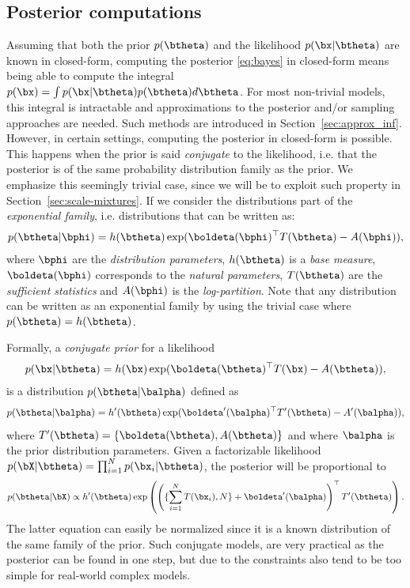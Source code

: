 \subsection{Posterior computations}
\label{sec:posterior}
Assuming that both the prior $p(\btheta)$ and the likelihood $p(\bx|\btheta)$ are known in closed-form, computing the posterior \eqref{eq:bayes} in closed-form means being able to compute the integral $p(\bx)=\int p(\bx|\btheta)p(\btheta)d\btheta$.
For most non-trivial models, this integral is intractable and approximations to the posterior and/or sampling approaches are needed.
Such methods are introduced in Section~\ref{sec:approx_inf}.
However, in certain settings, computing the posterior in closed-form is possible.
This happens when the prior is said \textit{conjugate} to the likelihood, i.e. that the posterior is of the same probability distribution family as the prior.
We emphasize this seemingly trivial case, since we will be to exploit such property in Section~\ref{sec:scale-mixtures}.
If we consider the distributions part of the \textit{exponential family}, i.e. distributions that can be written as:
\begin{align}
    p(\btheta|\bphi) = h(\btheta)\exp(\boldeta(\bphi)^\top T(\btheta) - A(\bphi)),
    \label{eq:expfamily}
\end{align}
where $\bphi$ are the \textit{distribution parameters}, $h(\btheta)$ is a \textit{base measure}, $\boldeta(\bphi)$ corresponds to the \textit{natural parameters}, $T(\btheta)$ are the \textit{sufficient statistics} and $A(\bphi)$ is the \textit{log-partition}.
Note that any distribution can be written as an exponential family by using the trivial case where $p(\btheta)=h(\btheta)$.

Formally, a \textit{conjugate prior} for a likelihood
\begin{align}
    p(\bx|\btheta) = h(\bx)\exp(\boldeta(\btheta)^\top T(\bx) - A(\btheta)),
    \label{eq:explikelihood}
\end{align}
is a distribution $p(\btheta|\balpha)$ defined as
\begin{align}
    p(\btheta|\balpha) = h'(\btheta)\exp(\boldeta'(\balpha)^\top T'(\btheta) - A'(\balpha)),
    \label{eq:expprior}
\end{align}
where $T'(\btheta) = \left\{\boldeta(\btheta), A(\btheta)\right\}$ and where $\balpha$ is the prior distribution parameters.
Given a factorizable likelihood $p(\bX|\btheta) = \prod_{i=1}^N p(\bx_i|\btheta)$, the posterior will be proportional to
\begin{align*}
    p(\btheta|\bX) \propto h'(\btheta)\exp\left(\left(\{\sum_{i=1}^N T(\bx_i), N\} + \boldeta'(\balpha)\right)^\top T'(\btheta)\right).
\end{align*}
The latter equation can easily be normalized since it is a known distribution of the same family of the prior.
Such conjugate models, are very practical as the posterior can be found in one step, but due to the constraints also tend to be too simple for real-world complex models.

